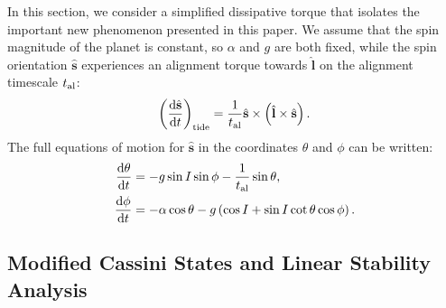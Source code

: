 \documentclass[
        fleqn,
        usenatbib,
    ]{mnras}
\newcommand*{\rd}[2]{\frac{\mathrm{d}#1}{\mathrm{d}#2}}
\newcommand*{\p}[1]{\left(#1\right)}
\newcommand*{\uv}[1]{\hat{\mathbf{#1}}}
\begin{document}
In this section, we consider a simplified dissipative torque that isolates the
important new phenomenon presented in this paper. We assume that the spin
magnitude of the planet is constant, so $\alpha$ and $g$ are both fixed, while
the spin orientation $\uv{s}$ experiences an alignment torque towards $\uv{l}$
on the alignment timescale $t_{\rm al}$:
\begin{equation}
    \p{\rd{\uv{s}}{t}}_{\rm tide}
        = \frac{1}{t_{\rm al}} \uv{s} \times \p{\uv{l} \times \uv{s}}.
        \label{eq:dsdt_tide_toy}
\end{equation}
The full equations of motion for $\uv{s}$ in the coordinates $\theta$ and $\phi$
can be written:
\begin{align}
    \rd{\theta}{t} &= -g\sin I \sin \phi - \frac{1}{t_{\rm al}} \sin \theta,
        \label{eq:dqdt_toy}\\
    \rd{\phi}{t} &= -\alpha \cos\theta
        - g\p{\cos I + \sin I \cot \theta \cos \phi}.\label{eq:dfdt_toy}
\end{align}

\subsection{Modified Cassini States and Linear Stability
Analysis}\label{ss:tidal_equils}
\end{document}

